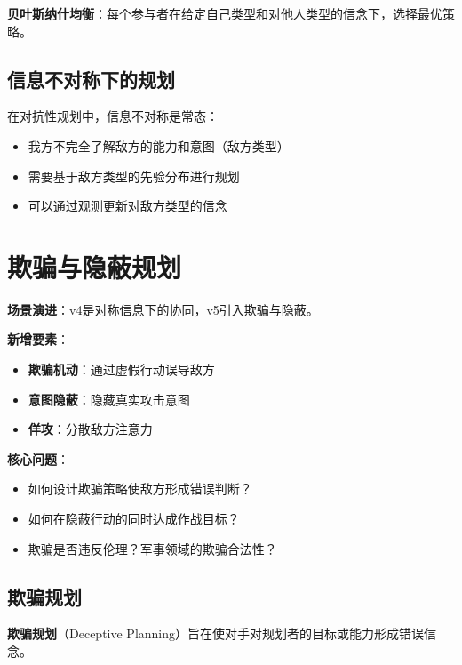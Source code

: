 \textbf{贝叶斯纳什均衡}：每个参与者在给定自己类型和对他人类型的信念下，选择最优策略。

\subsection{信息不对称下的规划}

在对抗性规划中，信息不对称是常态：
\begin{itemize}[leftmargin=2em]
  \item 我方不完全了解敌方的能力和意图（敌方类型）
  \item 需要基于敌方类型的先验分布进行规划
  \item 可以通过观测更新对敌方类型的信念
\end{itemize}

\section{欺骗与隐蔽规划}

\begin{caseboxB}
\textbf{场景演进}：v4是对称信息下的协同，v5引入欺骗与隐蔽。

\textbf{新增要素}：
\begin{itemize}
  \item \textbf{欺骗机动}：通过虚假行动误导敌方
  \item \textbf{意图隐蔽}：隐藏真实攻击意图
  \item \textbf{佯攻}：分散敌方注意力
\end{itemize}

\textbf{核心问题}：
\begin{itemize}
  \item 如何设计欺骗策略使敌方形成错误判断？
  \item 如何在隐蔽行动的同时达成作战目标？
  \item 欺骗是否违反伦理？军事领域的欺骗合法性？
\end{itemize}
\end{caseboxB}

\subsection{欺骗规划}

\begin{definition}[欺骗规划]
\textbf{欺骗规划}（Deceptive Planning）旨在使对手对规划者的目标或能力形成错误信念。
\end{definition}

